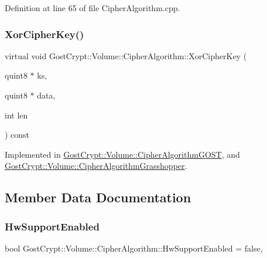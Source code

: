 Definition at line 65 of file Cipher\+Algorithm.\+cpp.

\mbox{\label{class_gost_crypt_1_1_volume_1_1_cipher_algorithm_a1be05f68ce3c18e7cd76708739f3f85a}} 
\subsubsection{\texorpdfstring{Xor\+Cipher\+Key()}{XorCipherKey()}}
{\footnotesize\ttfamily virtual void Gost\+Crypt\+::\+Volume\+::\+Cipher\+Algorithm\+::\+Xor\+Cipher\+Key (\begin{DoxyParamCaption}\item[{quint8 $\ast$}]{ks,  }\item[{quint8 $\ast$}]{data,  }\item[{int}]{len }\end{DoxyParamCaption}) const\hspace{0.3cm}{\ttfamily [pure virtual]}}



Implemented in \hyperlink{class_gost_crypt_1_1_volume_1_1_cipher_algorithm_g_o_s_t_a0cc29efdab0704c4d7211988f8303a15}{Gost\+Crypt\+::\+Volume\+::\+Cipher\+Algorithm\+G\+O\+ST}, and \hyperlink{class_gost_crypt_1_1_volume_1_1_cipher_algorithm_grasshopper_a282165ace19ed71c00dc92e33f0b3738}{Gost\+Crypt\+::\+Volume\+::\+Cipher\+Algorithm\+Grasshopper}.



\subsection{Member Data Documentation}
\mbox{\label{class_gost_crypt_1_1_volume_1_1_cipher_algorithm_ac535fb245b3bf71b80fde9784230ae97}} 
\subsubsection{\texorpdfstring{Hw\+Support\+Enabled}{HwSupportEnabled}}
{\footnotesize\ttfamily bool Gost\+Crypt\+::\+Volume\+::\+Cipher\+Algorithm\+::\+Hw\+Support\+Enabled = false\hspace{0.3cm}{\ttfamily [static]}, {\ttfamily [protected]}}



